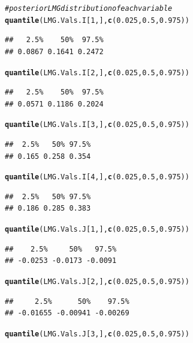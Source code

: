 \documentclass[11pt,a4paper,twoside]{book}\usepackage[]{graphicx}\usepackage[]{color}
\makeatletter
\newcommand{\hlnum}[1]{\textcolor[rgb]{0.686,0.059,0.569}{#1}}%
\newcommand{\hlcom}[1]{\textcolor[rgb]{0.678,0.584,0.686}{\textit{#1}}}%
\newcommand{\hlstd}[1]{\textcolor[rgb]{0.345,0.345,0.345}{#1}}%
\newcommand{\hlkwd}[1]{\textcolor[rgb]{0.737,0.353,0.396}{\textbf{#1}}}%
\newenvironment{kframe}{%
 \def\at@end@of@kframe{}%
 \ifinner\ifhmode%
  \def\at@end@of@kframe{\end{minipage}}%
  \begin{minipage}{\columnwidth}%
 \fi\fi%
 \def\FrameCommand##1{\hskip\@totalleftmargin \hskip-\fboxsep
 \colorbox{shadecolor}{##1}\hskip-\fboxsep
     \hskip-\linewidth \hskip-\@totalleftmargin \hskip\columnwidth}%
 \MakeFramed {\advance\hsize-\width
   \@totalleftmargin\z@ \linewidth\hsize
   \@setminipage}}%
 {\par\unskip\endMakeFramed%
 \at@end@of@kframe}
\newenvironment{knitrout}{}{} %
\makeatother
\begin{document}
\begin{knitrout}
\begin{kframe}
\begin{alltt}
\hlcom{# posterior LMG distribution of each variable}
\hlkwd{quantile}\hlstd{(LMG.Vals.I[}\hlnum{1}\hlstd{,],} \hlkwd{c}\hlstd{(}\hlnum{0.025}\hlstd{,} \hlnum{0.5}\hlstd{,} \hlnum{0.975}\hlstd{))}
\end{alltt}
\begin{verbatim}
##   2.5%    50%  97.5% 
## 0.0867 0.1641 0.2472
\end{verbatim}
\begin{alltt}
\hlkwd{quantile}\hlstd{(LMG.Vals.I[}\hlnum{2}\hlstd{,],} \hlkwd{c}\hlstd{(}\hlnum{0.025}\hlstd{,} \hlnum{0.5}\hlstd{,} \hlnum{0.975}\hlstd{))}
\end{alltt}
\begin{verbatim}
##   2.5%    50%  97.5% 
## 0.0571 0.1186 0.2024
\end{verbatim}
\begin{alltt}
\hlkwd{quantile}\hlstd{(LMG.Vals.I[}\hlnum{3}\hlstd{,],} \hlkwd{c}\hlstd{(}\hlnum{0.025}\hlstd{,} \hlnum{0.5}\hlstd{,} \hlnum{0.975}\hlstd{))}
\end{alltt}
\begin{verbatim}
##  2.5%   50% 97.5% 
## 0.165 0.258 0.354
\end{verbatim}
\begin{alltt}
\hlkwd{quantile}\hlstd{(LMG.Vals.I[}\hlnum{4}\hlstd{,],} \hlkwd{c}\hlstd{(}\hlnum{0.025}\hlstd{,} \hlnum{0.5}\hlstd{,} \hlnum{0.975}\hlstd{))}
\end{alltt}
\begin{verbatim}
##  2.5%   50% 97.5% 
## 0.186 0.285 0.383
\end{verbatim}
\begin{alltt}
\hlkwd{quantile}\hlstd{(LMG.Vals.J[}\hlnum{1}\hlstd{,],} \hlkwd{c}\hlstd{(}\hlnum{0.025}\hlstd{,} \hlnum{0.5}\hlstd{,} \hlnum{0.975}\hlstd{))}
\end{alltt}
\begin{verbatim}
##    2.5%     50%   97.5% 
## -0.0253 -0.0173 -0.0091
\end{verbatim}
\begin{alltt}
\hlkwd{quantile}\hlstd{(LMG.Vals.J[}\hlnum{2}\hlstd{,],} \hlkwd{c}\hlstd{(}\hlnum{0.025}\hlstd{,} \hlnum{0.5}\hlstd{,} \hlnum{0.975}\hlstd{))}
\end{alltt}
\begin{verbatim}
##     2.5%      50%    97.5% 
## -0.01655 -0.00941 -0.00269
\end{verbatim}
\begin{alltt}
\hlkwd{quantile}\hlstd{(LMG.Vals.J[}\hlnum{3}\hlstd{,],} \hlkwd{c}\hlstd{(}\hlnum{0.025}\hlstd{,} \hlnum{0.5}\hlstd{,} \hlnum{0.975}\hlstd{))}

\end{alltt}
\end{kframe}
\end{knitrout}
\end{document}
